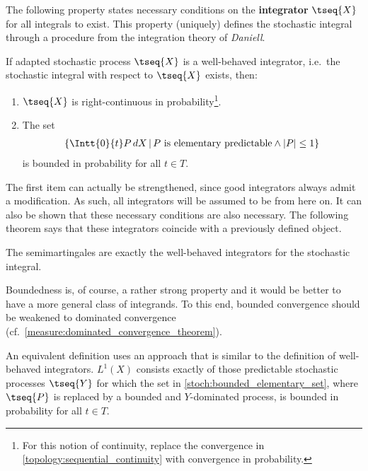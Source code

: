     The following property states necessary conditions on the \textbf{integrator} $\tseq{X}$ for all integrals to exist. This property (uniquely) defines the stochastic integral through a procedure from the integration theory of \textit{Daniell}.
    \begin{property}
        If adapted stochastic process $\tseq{X}$ is a well-behaved integrator, i.e.~the stochastic integral with respect to $\tseq{X}$ exists, then:
        \begin{enumerate}
            \item $\tseq{X}$ is right-continuous in probability\footnote{For this notion of continuity, replace the convergence in \cref{topology:sequential_continuity} with convergence in probability.}.
            \item The set
            \begin{gather}
                \label{stoch:bounded_elementary_set}
                \left\{\Intt{0}{t}P\,dX\,\middle\vert\, P\text{ is elementary predictable}\land|P|\leq1\right\}
            \end{gather}
            is bounded in probability for all $t\in T$.
        \end{enumerate}
    \end{property}
    The first item can actually be strengthened, since good integrators always admit a \cdlg modification. As such, all integrators will be assumed to be \cdlg from here on. It can also be shown that these necessary conditions are also necessary. The following theorem says that these integrators coincide with a previously defined object.

    \begin{theorem}
        The semimartingales are exactly the well-behaved integrators for the stochastic integral.
    \end{theorem}

    Boundedness is, of course, a rather strong property and it would be better to have a more general class of integrands. To this end, bounded convergence should be weakened to dominated convergence (cf.~\cref{measure:dominated_convergence_theorem}).
    \begin{remark}
        An equivalent definition uses an approach that is similar to the definition of well-behaved integrators. $L^1(X)$ consists exactly of those predictable stochastic processes $\tseq{Y}$ for which the set in \cref{stoch:bounded_elementary_set}, where $\tseq{P}$ is replaced by a bounded and $Y$-dominated process, is bounded in probability for all $t\in T$.
    \end{remark}


